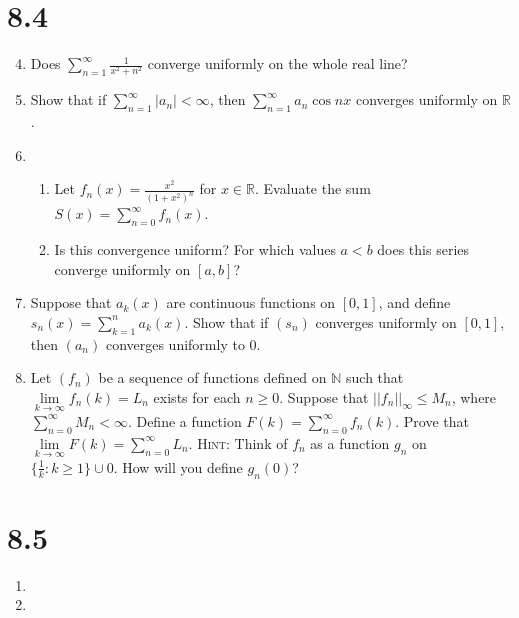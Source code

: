 \documentclass[letterpaper]{article}
\begin{document}
\renewcommand{\labelenumi}{\Alph{enumi}.}
\renewcommand{\labelenumii}{(\alph{enumii})}
\section*{8.4}
\begin{enumerate}
\setcounter{enumi}{3}
\item
Does $\sum\limits_{n=1}^\infty{\frac{1}{x^2+n^2}}$ converge uniformly on the whole real line?
\item
Show that if $\sum\limits_{n=1}^\infty{\lvert a_n\rvert}<\infty$, then $\sum\limits_{n=1}^\infty{a_n\cos nx}$ converges uniformly on $\mathbb{R}$.
\item
  \begin{enumerate}
  \item
  Let $f_n(x)=\frac{x^2}{(1+x^2)^n}$ for $x\in \mathbb{R}$. Evaluate the sum $S(x)=\sum\limits_{n=0}^\infty{f_n(x)}$.
  \item
  Is this convergence uniform? For which values $a<b$ does this series converge uniformly on $[a,b]$?
  \end{enumerate}
\setcounter{enumi}{7}
\item
Suppose that $a_k(x)$ are continuous functions on $[0,1]$, and define $s_n(x)=\sum\limits_{k=1}^n{a_k(x)}$. Show that if $(s_n)$ converges uniformly on $[0,1]$, then $(a_n)$ converges uniformly to $0$.
\setcounter{enumi}{9}
\item
Let $(f_n)$ be a sequence of functions defined on $\mathbb{N}$ such that $\lim\limits_{k\to\infty}f_n(k)=L_n$ exists for each $n\ge 0$. Suppose that $||f_n||_\infty\le M_n$, where $\sum\limits_{n=0}^\infty{M_n}<\infty$. Define a function $F(k)=\sum\limits_{n=0}^\infty{f_n(k)}$. Prove that $\lim\limits_{k\to\infty}F(k)=\sum\limits_{n=0}^\infty{L_n}$.
{\scshape Hint:} Think of $f_n$ as a function $g_n$ on $\{\frac{1}{k}:k\ge 1\}\cup{0}$. How will you define $g_n(0)$?
\end{enumerate}
\section*{8.5}
\begin{enumerate}
\item
\item
\end{enumerate}
\end{document}
